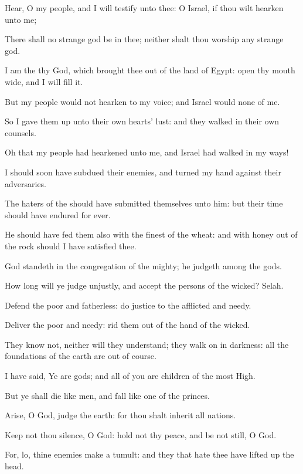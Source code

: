 \Verse Hear, O my people, and I will testify unto thee: O Israel, if thou wilt hearken unto me;

\Verse There shall no strange god be in thee; neither shalt thou worship any strange god.

\Verse I am the \LORD thy God, which brought thee out of the land of Egypt: open thy mouth wide, and I will fill it.

\Verse But my people would not hearken to my voice; and Israel would none of me.

\Verse So I gave them up unto their own hearts' lust: and they walked in their own counsels.

\Verse Oh that my people had hearkened unto me, and Israel had walked in my ways!

\Verse I should soon have subdued their enemies, and turned my hand against their adversaries.

\Verse The haters of the \LORD should have submitted themselves unto him: but their time should have endured for ever.

\Verse He should have fed them also with the finest of the wheat: and with honey out of the rock should I have satisfied thee.




\Chapter
\Verse God standeth in the congregation of the mighty; he judgeth among the gods.

\Verse How long will ye judge unjustly, and accept the persons of the wicked? Selah.

\Verse Defend the poor and fatherless: do justice to the afflicted and needy.

\Verse Deliver the poor and needy: rid them out of the hand of the wicked.

\Verse They know not, neither will they understand; they walk on in darkness: all the foundations of the earth are out of course.

\Verse I have said, Ye are gods; and all of you are children of the most High.

\Verse But ye shall die like men, and fall like one of the princes.

\Verse Arise, O God, judge the earth: for thou shalt inherit all nations.




\Chapter
\Verse Keep not thou silence, O God: hold not thy peace, and be not still, O God.

\Verse For, lo, thine enemies make a tumult: and they that hate thee have lifted up the head.

